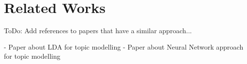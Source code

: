 \section{Related Works} %
\label{sec:related_works}

\colorbox{yellow!30}{ToDo:} Add references to papers that have a similar approach...

- Paper about LDA for topic modelling
- Paper about Neural Network approach for topic modelling